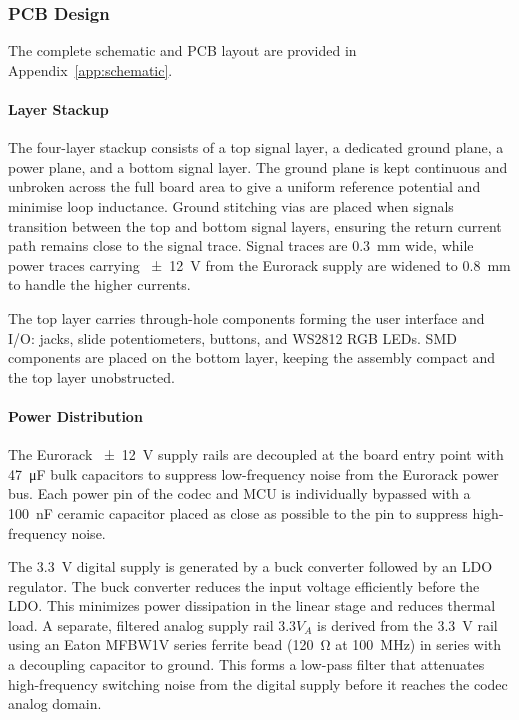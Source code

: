 \newpage
\subsubsection{PCB Design}

The complete schematic and PCB layout are provided in 
Appendix~\ref{app:schematic}.

\paragraph{Layer Stackup}

The four-layer stackup consists of a top signal layer, a dedicated ground plane, a power plane, and a bottom signal layer.
The ground plane is kept continuous and unbroken across the full board area to give a uniform reference potential and minimise loop inductance.
Ground stitching vias are placed when signals transition between the top and bottom signal layers, ensuring the return current path remains close to the signal trace.
Signal traces are \qty{0.3}{\milli\meter} wide, while power traces carrying \qty{\pm 12}{\volt} from the Eurorack supply are widened to \qty{0.8}{\milli\meter} to handle the higher currents.

The top layer carries through-hole components forming the user interface and I/O: jacks, slide potentiometers, buttons, and WS2812 RGB LEDs.
SMD components are placed on the bottom layer, keeping the assembly compact and the top layer unobstructed.

\paragraph{Power Distribution}

The Eurorack \qty{\pm 12}{\volt} supply rails are decoupled at the board entry point with \qty{47}{\micro\farad} bulk capacitors to suppress low-frequency noise from the Eurorack power bus.
Each power pin of the codec and MCU is individually bypassed with a \qty{100}{\nano\farad} ceramic capacitor placed as close as possible to the pin to suppress high-frequency noise.

The \qty{3.3}{\volt} digital supply is generated by a buck converter followed by an LDO regulator.
The buck converter reduces the input voltage efficiently before the LDO. 
This minimizes power dissipation in the linear stage and reduces thermal load.
A separate, filtered analog supply rail \(3.3V_A\) is derived from the \qty{3.3}{\volt} rail using an Eaton MFBW1V series ferrite bead (\qty{120}{\ohm} at \qty{100}{\mega\hertz}) in series with a decoupling capacitor to ground.
This forms a low-pass filter that attenuates high-frequency switching noise from the digital supply before it reaches the codec analog domain.

